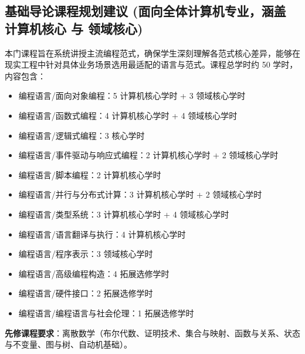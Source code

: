\subsection{基础导论课程规划建议 (面向全体计算机专业，涵盖 计算机核心 与 领域核心)}
本门课程旨在系统讲授主流编程范式，确保学生深刻理解各范式核心差异，能够在现实工程中针对具体业务场景选用最适配的语言与范式。课程总学时约 50 学时，内容包含：
\begin{itemize}
    \item 编程语言/面向对象编程：5 计算机核心学时 + 3 领域核心学时
    \item 编程语言/函数式编程：4 计算机核心学时 + 4 领域核心学时
    \item 编程语言/逻辑式编程：3 核心学时
    \item 编程语言/事件驱动与响应式编程：2 计算机核心学时 + 2 领域核心学时
    \item 编程语言/脚本编程：2 计算机核心学时
    \item 编程语言/并行与分布式计算：3 计算机核心学时 + 2 领域核心学时
    \item 编程语言/类型系统：3 计算机核心学时 + 4 领域核心学时
    \item 编程语言/语言翻译与执行：4 计算机核心学时
    \item 编程语言/程序表示：3 领域核心学时
    \item 编程语言/高级编程构造：4 拓展选修学时
    \item 编程语言/硬件接口：2 拓展选修学时
    \item 编程语言/编程语言与社会伦理：1 拓展选修学时
\end{itemize}
\textbf{先修课程要求}：离散数学（布尔代数、证明技术、集合与映射、函数与关系、状态与不变量、图与树、自动机基础）。

